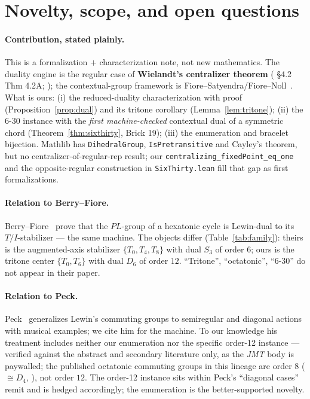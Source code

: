 \documentclass[11pt]{article}
\newcommand{\lean}[1]{\texttt{#1}}
\newcommand{\Dgrp}[1]{D_{#1}}
\begin{document}
\section{Novelty, scope, and open questions}\label{sec:novelty}

\paragraph{Contribution, stated plainly.} This is a formalization $+$ characterization note, not new
mathematics. The duality engine is the regular case of \textbf{Wielandt's centralizer theorem}
(\cite{DM} \S4.2 Thm 4.2A; \cite{Cam}); the contextual-group framework is
Fiore--Satyendra/Fiore--Noll~\cite{FS,FN11,FN25}. What is ours: (i) the reduced-duality characterization
with proof (Proposition~\ref{prop:dual}) and its tritone corollary (Lemma~\ref{lem:tritone}); (ii) the
6-30 instance with the \emph{first machine-checked} contextual dual of a symmetric chord
(Theorem~\ref{thm:sixthirty}, Brick 19); (iii) the enumeration and bracelet bijection. Mathlib has
\lean{DihedralGroup}, \lean{IsPretransitive} and Cayley's theorem, but no centralizer-of-regular-rep
result; our \lean{centralizing\_fixedPoint\_eq\_one} and the opposite-regular construction in
\lean{SixThirty.lean} fill that gap as first formalizations.

\paragraph{Relation to Berry--Fiore.} Berry--Fiore~\cite{BF} prove that the $PL$-group of a hexatonic
cycle is Lewin-dual to its $T/I$-stabilizer --- the same machine. The objects differ
(Table~\ref{tab:family}): theirs is the augmented-axis stabilizer $\{T_0,T_4,T_8\}$ with dual $S_3$ of
order $6$; ours is the tritone center $\{T_0,T_6\}$ with dual $\Dgrp{6}$ of order $12$. ``Tritone'',
``octatonic'', ``6-30'' do not appear in their paper.

\paragraph{Relation to Peck.} Peck~\cite{Peck} generalizes Lewin's commuting groups to semiregular and
diagonal actions with musical examples; we cite him for the machine. To our knowledge his treatment
includes neither our enumeration nor the specific order-12 instance --- verified against the abstract and
secondary literature only, as the \emph{JMT} body is paywalled; the published octatonic commuting groups
in this lineage are order $8$ ($\cong\Dgrp{4}$, \cite{FN11}), not order $12$. The order-12 instance sits
within Peck's ``diagonal cases'' remit and is hedged accordingly; the enumeration is the better-supported
novelty.
\end{document}
